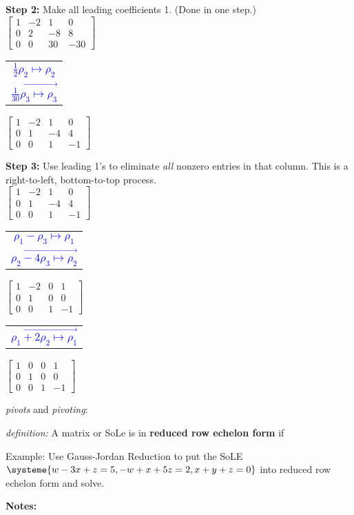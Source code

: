 \documentclass[11pt,fleqn]{article}
\begin{document}
\vfill

\noindent\textbf{Step 2:} Make all leading coefficients 1. (Done in one step.) \\

$\begin{bmatrix} 1&-2&1&0\\0&2&-8&8\\0&0&30&-30 \end{bmatrix}$ \quad 
\begin{tabular}{c} 
\textcolor{blue}{$\frac{1}{2}\rho_2\mapsto \rho_2$}\\ 
\textcolor{blue}{$\overrightarrow{\frac{1}{30}\rho_3\mapsto \rho_3}$} 
\end{tabular}
\quad
$\begin{bmatrix} 1&-2&1&0\\0&1&-4&4\\0&0&1&-1 \end{bmatrix}$\\

\vfill

\noindent\textbf{Step 3:}  Use leading 1's to eliminate \emph{all} nonzero entries in that column. This is a right-to-left, bottom-to-top process. \\

$\begin{bmatrix} 1&-2&1&0\\0&1&-4&4\\0&0&1&-1 \end{bmatrix}$
\quad 
\begin{tabular}{c} 
\textcolor{blue}{$\rho_1-\rho_3\mapsto \rho_1$}\\ 
\textcolor{blue}{$\overrightarrow{\rho_2-4\rho_3\mapsto \rho_2}$}
\end{tabular}
\quad
$\begin{bmatrix} 1&-2&0&1\\0&1&0&0\\0&0&1&-1 \end{bmatrix}$
\quad 
\begin{tabular}{c} 
\textcolor{blue}{$\overrightarrow{\rho_1+2\rho_2\mapsto \rho_1}$}
\end{tabular}
\quad
$\begin{bmatrix} 1&0&0&1\\0&1&0&0\\0&0&1&-1 \end{bmatrix}$

\vfill

\emph{pivots} and \emph{pivoting}:

\vspace{1in}

\emph{definition:} A matrix or SoLe is in \textbf{reduced row echelon form} if 

\vspace{1in}
\newpage
\noindent Example: Use Gauss-Jordan Reduction to put the SoLE $\systeme{w-3x+z=5,-w+x+5z=2,x+y+z=0}$ into reduced row echelon form and solve. 
\vfill

\textbf{Notes:}
\vfill
\end{document}
